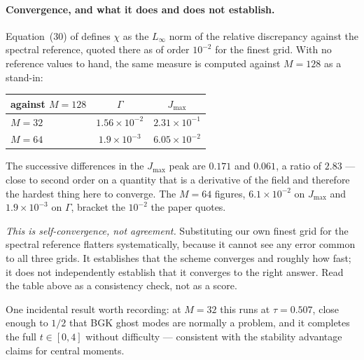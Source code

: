 \documentclass[11pt,a4paper]{article}
\newcommand{\e}[1]{\times 10^{#1}}
\begin{document}
\paragraph{Convergence, and what it does and does not establish.} Equation~(30)
of \cite{derosis2017pre} defines $\chi$ as the $L_\infty$ norm of the relative
discrepancy against the spectral reference, quoted there as of order $10^{-2}$
for the finest grid. With no reference values to hand, the same measure is
computed against $M=128$ as a stand-in:
\begin{center}\small
\begin{tabular}{lcc}
\toprule
against $M=128$ & $\Gamma$ & $J_{\max}$ \\
\midrule
$M=32$ & $1.56\e{-2}$ & $2.31\e{-1}$ \\
$M=64$ & $1.9\e{-3}$  & $6.05\e{-2}$ \\
\bottomrule
\end{tabular}
\end{center}
\noindent The successive differences in the $J_{\max}$ peak are $0.171$ and
$0.061$, a ratio of $2.83$ --- close to second order on a quantity that is a
derivative of the field and therefore the hardest thing here to converge. The
$M=64$ figures, $6.1\e{-2}$ on $J_{\max}$ and $1.9\e{-3}$ on $\Gamma$, bracket
the $10^{-2}$ the paper quotes.

\emph{This is self-convergence, not agreement.} Substituting our own finest grid
for the spectral reference flatters systematically, because it cannot see any
error common to all three grids. It establishes that the scheme converges and
roughly how fast; it does not independently establish that it converges to the
right answer. Read the table above as a consistency check, not as a score.

\medskip
\noindent One incidental result worth recording: at $M=32$ this runs at
$\tau=0.507$, close enough to $1/2$ that BGK ghost modes are normally a problem,
and it completes the full $t\in[0,4]$ without difficulty --- consistent with the
stability advantage \cite{derosis2017pre} claims for central moments.
\end{document}
